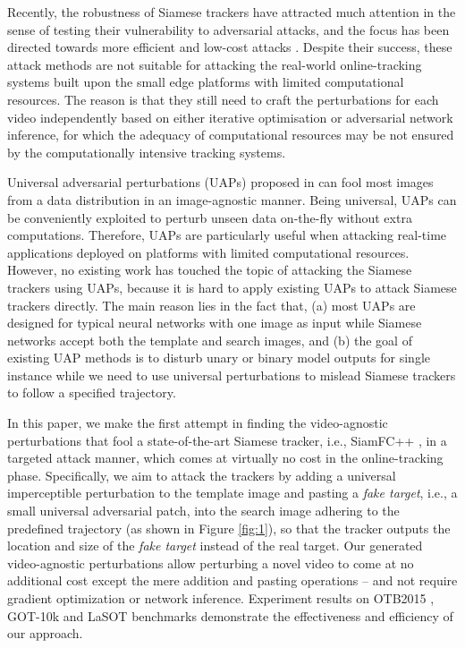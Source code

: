\documentclass[journal]{IEEEtran}
\newcommand{\ie}{i.e.}
\begin{document}
Recently, the robustness of Siamese trackers have attracted much attention in the sense of testing their vulnerability to adversarial attacks, and the focus has been directed towards more efficient and low-cost attacks \cite{TTP,FAN,SPARK}. Despite their success, these attack methods are not suitable for attacking the real-world online-tracking systems built upon the small edge platforms with limited computational resources. The reason is that they still need to craft the perturbations for each video independently based on either iterative optimisation or adversarial network inference, for which the adequacy of computational resources may be not ensured by the computationally intensive tracking systems. 

Universal adversarial perturbations (UAPs) proposed in \cite{UAP} can fool most images from a data distribution in an image-agnostic manner. Being universal, UAPs can be conveniently exploited to perturb unseen data on-the-fly without extra computations. Therefore, UAPs are particularly useful when attacking real-time applications deployed on platforms with limited computational resources. However, no existing work has touched the topic of attacking the Siamese trackers using UAPs, because it is hard to apply existing UAPs to attack Siamese trackers directly. The main reason lies in the fact that, (a) most UAPs are designed for typical neural networks with one image as input while Siamese networks accept both the template and search images, and (b) the goal of existing UAP methods is to disturb unary or binary model outputs for single instance while we need to use universal perturbations to mislead Siamese trackers to follow a specified trajectory.
  
In this paper, we make the first attempt in finding the video-agnostic perturbations that fool a state-of-the-art Siamese tracker, \ie, SiamFC++ \cite{SiamFC++}, in a targeted attack manner, which comes at virtually no cost in the online-tracking phase. Specifically, we aim to attack the trackers by adding a universal imperceptible perturbation to the template image and pasting a \textit{fake target}, \ie, a small universal adversarial patch, into the search image adhering to the predefined trajectory (as shown in Figure \ref{fig:1}), so that the tracker outputs the location and size of the \textit{fake target} instead of the real target. Our generated video-agnostic perturbations allow perturbing a novel video to come at no additional cost except the mere addition and pasting operations -- and not require gradient optimization or network inference. Experiment results on OTB2015 \cite{OTB}, GOT-10k \cite{GOT-10k} and LaSOT \cite{GOT-10k} benchmarks demonstrate the effectiveness and efficiency of our approach.
\end{document}
